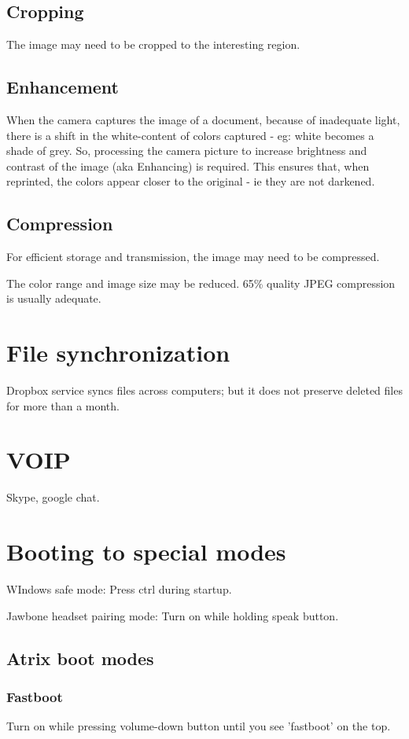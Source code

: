 \documentclass[oneside, article]{memoir}
\begin{document}
\subsection{Cropping}
The image may need to be cropped to the interesting region.

\subsection{Enhancement}
When the camera captures the image of a document, because of inadequate light, there is a shift in the white-content of  colors captured - eg: white becomes a shade of grey. So, processing the camera picture to increase brightness and contrast of the image (aka Enhancing) is required. This ensures that, when reprinted, the colors appear closer to the original - ie they are not darkened.

\subsection{Compression}
For efficient storage and transmission, the image may need to be compressed.

The color range and image size may be reduced. 65\% quality JPEG compression is usually adequate.

\section{File synchronization}
Dropbox service syncs files across computers; but it does not preserve deleted files for more than a month.

\section{VOIP}
Skype, google chat.

\section{Booting to special modes}

WIndows safe mode: Press ctrl during startup.

Jawbone headset pairing mode: Turn on while holding speak button.

\subsection{Atrix boot modes}
\subsubsection{Fastboot}
Turn on while pressing volume-down button until you see 'fastboot' on the top.
\end{document}
